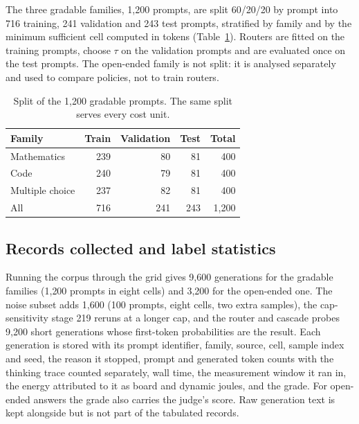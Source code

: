 \documentclass[final,5p,times,twocolumn]{elsarticle}
\theoremstyle{plain}
\begin{document}
The three gradable families, 1{,}200 prompts, are split 60/20/20 by prompt
into 716 training, 241 validation and 243 test prompts, stratified by family
and by the minimum sufficient cell computed in tokens
(Table~\ref{tab:splits}). Routers are fitted on the training prompts, choose
$\tau$ on the validation prompts and are evaluated once on the test prompts.
The open-ended family is not split: it is analysed separately and used to
compare policies, not to train routers.

\begin{table}[ht]
\centering
\caption{Split of the 1{,}200 gradable prompts. The same split serves every
cost unit.}
\label{tab:splits}
\begin{tabular}{@{}lrrrr@{}}
\toprule
Family & Train & Validation & Test & Total \\
\midrule
Mathematics     & 239 & 80 & 81 & 400 \\
Code            & 240 & 79 & 81 & 400 \\
Multiple choice & 237 & 82 & 81 & 400 \\
\midrule
All             & 716 & 241 & 243 & 1{,}200 \\
\bottomrule
\end{tabular}
\end{table}

\subsection{Records collected and label statistics}
\label{sec:data-records}

Running the corpus through the grid gives 9{,}600 generations for the
gradable families (1{,}200 prompts in eight cells) and 3{,}200 for the
open-ended one. The noise subset adds 1{,}600 (100 prompts, eight cells, two
extra samples), the cap-sensitivity stage 219 reruns at a longer cap, and the
router and cascade probes 9{,}200 short generations whose first-token
probabilities are the result. Each generation is stored with its prompt
identifier, family, source, cell, sample index and seed, the reason it
stopped, prompt and generated token counts with the thinking trace counted
separately, wall time, the measurement window it ran in, the energy
attributed to it as board and dynamic joules, and the grade. For open-ended
answers the grade also carries the judge's score. Raw generation text is kept
alongside but is not part of the tabulated records.
\end{document}
